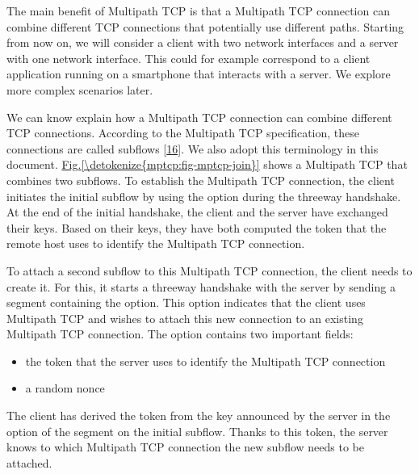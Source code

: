 \documentclass[letterpaper,10pt,english]{sphinxmanual}
\begin{document}
\sphinxAtStartPar
The main benefit of Multipath TCP is that a Multipath TCP connection can combine different TCP connections that potentially use different paths. Starting from now on, we will consider a client with two network interfaces and a server with one network interface. This could for example correspond to a client application running on a smartphone that interacts with a server. We explore more complex scenarios later.

\sphinxAtStartPar
We can know explain how a Multipath TCP connection can combine different TCP connections. According to the Multipath TCP specification, these connections are called subflows {[}\hyperlink{cite.biblio:id8500}{16}{]}. We also adopt this terminology in this document. \hyperref[\detokenize{mptcp:fig-mptcp-join}]{Fig.\@ \ref{\detokenize{mptcp:fig-mptcp-join}}} shows a Multipath TCP that combines two subflows. To establish the Multipath TCP connection, the client initiates the initial subflow by using the  option during the three\sphinxhyphen{}way handshake. At the end of the initial handshake, the client and the server have exchanged their keys. Based on their keys, they have both computed the token that the remote host uses to identify the Multipath TCP connection.

\sphinxAtStartPar
To attach a second subflow to this Multipath TCP connection, the client needs to create it. For this, it starts a three\sphinxhyphen{}way handshake with the server by sending a  segment containing the  option. This option indicates that the client uses Multipath TCP and wishes to attach this new connection to an existing Multipath TCP connection. The  option contains two important fields:
\begin{itemize}
\item {} 
\sphinxAtStartPar
the token that the server uses to identify the Multipath TCP connection

\item {} 
\sphinxAtStartPar
a random nonce

\end{itemize}

\sphinxAtStartPar
The client has derived the token from the key announced by the server in the  option of the  segment on the initial subflow. Thanks to this token, the server knows to which Multipath TCP connection the new subflow needs to be attached.
\end{document}
